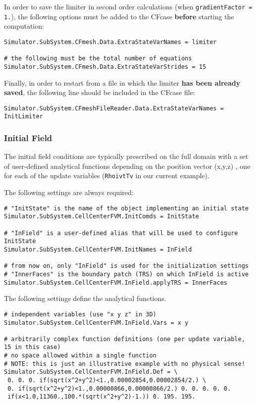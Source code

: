 \documentclass[11pt]{article}
\begin{document}
In order to save the limiter in second order calculations (when {\tt gradientFactor = 1.}), the following options must be added to the CFcase {\bf before} 
starting the computation:

\begin{verbatim}
Simulator.SubSystem.CFmesh.Data.ExtraStateVarNames = limiter

# the following must be the total number of equations
Simulator.SubSystem.CFmesh.Data.ExtraStateVarStrides = 15
\end{verbatim}

Finally, in order to restart from a file in which the limiter {\bf has been already saved}, 
the following line should be included in the CFcase file:

\begin{verbatim}
Simulator.SubSystem.CFmeshFileReader.Data.ExtraStateVarNames = InitLimiter
\end{verbatim}

\subsubsection{Initial Field}

The initial field conditions are typically prescribed on the full domain with a set of 
user-defined analytical functions depending on the position vector (x,y,z) \cite{FParser}, 
one for each of the update variables ({\tt RhoivtTv} in our current example). 

The following settings are always required:
\begin{verbatim}
# "InitState" is the name of the object implementing an initial state 
Simulator.SubSystem.CellCenterFVM.InitComds = InitState

# "InField" is a user-defined alias that will be used to configure InitState
Simulator.SubSystem.CellCenterFVM.InitNames = InField

# from now on, only "InField" is used for the initialization settings
# "InnerFaces" is the boundary patch (TRS) on which InField is active
Simulator.SubSystem.CellCenterFVM.InField.applyTRS = InnerFaces
\end{verbatim}

The following settings define the analytical functions.
\begin{verbatim} 
# independent variables (use "x y z" in 3D)
Simulator.SubSystem.CellCenterFVM.InField.Vars = x y  

# arbitrarily complex function definitions (one per update variable, 15 in this case)
# no space allowed within a single function
# NOTE: this is just an illustrative example with no physical sense!
Simulator.SubSystem.CellCenterFVM.InField.Def = \
 0. 0. 0. if(sqrt(x^2+y^2)<1.,0.00002854,0.00002854/2.) \
 0. if(sqrt(x^2+y^2)<1.,0.00000866,0.00000866/2.) 0. 0. 0. 0. 0. 
 if(x<1.0,11360.,100.*(sqrt(x^2+y^2)-1.)) 0. 195. 195.
\end{verbatim}
\end{document}
